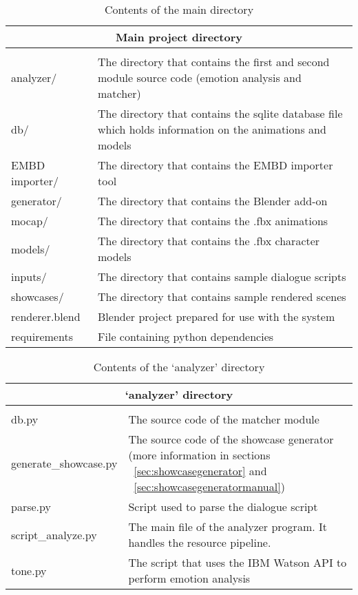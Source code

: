 \begin{table}[H]
	\centering
	\small
	
	\begin{tabular}{ |p{8.5em}|p{30.1em}| }
		\hline
		\multicolumn{2}{|c|}{\textbf{Main project directory}} \\
		\hline
		\thead{Item} & \thead{Description} \\
		\hline
		analyzer/ & The directory that contains the first and second module source code (emotion analysis and matcher) \\
		\hline
		db/ & The directory that contains the sqlite database file which holds information on the animations and models \\
		\hline
		EMBD importer/ & The directory that contains the EMBD importer tool \\
		\hline
		generator/ & The directory that contains the Blender add-on \\
		\hline
		mocap/ & The directory that contains the .fbx animations \\
		\hline
		models/ & The directory that contains the .fbx character models \\
		\hline
		inputs/ & The directory that contains sample dialogue scripts \\
		\hline
		showcases/ & The directory that contains sample rendered scenes \\
		\hline
		renderer.blend & Blender project prepared for use with the system \\
		\hline
		requirements & File containing python dependencies \\
		\hline
	\end{tabular}
	
	\caption{Contents of the main directory}
	\label{tab:maindirectory}
\end{table}

\begin{table}[H]
	\centering
	\small
	
	\begin{tabular}{ |p{8.5em}|p{30.1em}| }
		\hline
		\multicolumn{2}{|c|}{\textbf{`analyzer' directory}} \\
		\hline
		\thead{Item} & \thead{Description} \\
		\hline
		db.py & The source code of the matcher module \\
		\hline
		generate\_showcase.py & The source code of the showcase generator (more information in sections ~\ref{sec:showcasegenerator} and ~\ref{sec:showcasegeneratormanual}) \\
		\hline
		parse.py & Script used to parse the dialogue script \\
		\hline
		script\_analyze.py & The main file of the analyzer program. It handles the resource pipeline. \\
		\hline
		tone.py & The script that uses the IBM Watson API to perform emotion analysis \\
		\hline
	\end{tabular}
	
	\caption{Contents of the `analyzer' directory}
	\label{tab:analyzerdirectory}
\end{table}

